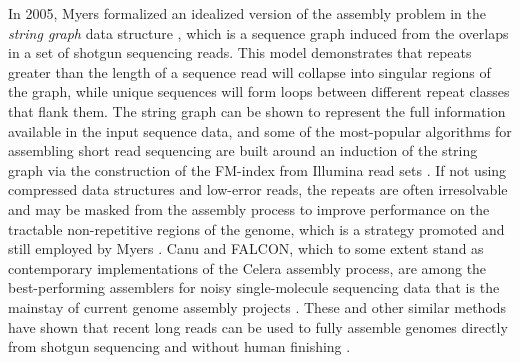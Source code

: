 In 2005, Myers formalized an idealized version of the assembly problem in the \emph{string graph} data structure \cite{myers2005}, which is a sequence graph induced from the overlaps in a set of shotgun sequencing reads.
This model demonstrates that repeats greater than the length of a sequence read will collapse into singular regions of the graph, while unique sequences will form loops between different repeat classes that flank them.
The string graph can be shown to represent the full information available in the input sequence data, and some of the most-popular algorithms for assembling short read sequencing are built around an induction of the string graph via the construction of the FM-index \cite{ferragina2001experimental} from Illumina read sets \cite{simpson2010,simpson2012efficient,li2015fermikit}.
If not using compressed data structures and low-error reads, the repeats are often irresolvable and may be masked from the assembly process to improve performance on the tractable non-repetitive regions of the genome, which is a strategy promoted and still employed by Myers \cite{myers2014efficient}.
Canu and FALCON, which to some extent stand as contemporary implementations of the Celera assembly process, are among the best-performing assemblers for noisy single-molecule sequencing data that is the mainstay of current genome assembly projects \cite{chin2016phased,koren2017canu}.
These and other similar methods have shown that recent long reads can be used to fully assemble genomes directly from shotgun sequencing and without human finishing \cite{loman2015complete,jain2018nanopore}.

